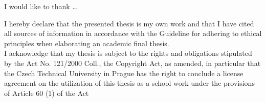 \documentclass[english,bachelor,unicode]{ctufit-thesis}
\theoremstyle{plain}
\theoremstyle{definition}
\theoremstyle{remark}
\numberwithin{theorem}{chapter}
\begin{document}
    \frontmatter\frontmatterinit %


    \thispagestyle{empty}\cleardoublepage\maketitle %

    \imprintpage %

    \tableofcontents %
    \listoffigures %

    \begin{acknowledgmentpage}
        I would like to thank \ldots %
    \end{acknowledgmentpage}


    \begin{declarationpage}
        I hereby declare that the presented thesis is my own work and that I have cited all
        sources of information in accordance with the Guideline for adhering to ethical
        principles when elaborating an academic final thesis.\\
        I acknowledge that my thesis is subject to the rights and obligations stipulated by the
        Act No. 121/2000 Coll., the Copyright Act, as amended, in particular that the Czech
        Technical University in Prague has the right to conclude a license agreement on the
        utilization of this thesis as a school work under the provisions of Article 60 (1) of the
        Act
    \end{declarationpage}
\end{document}
